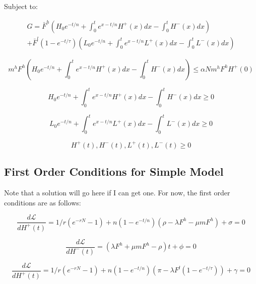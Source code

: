 \documentclass{easychithesis}
\newcommand{\Lagr}{\mathcal{L}}
\begin{document}
Subject to: 

\begin{multline}\label{eq:analyticalGen}
G = \bar{F}^h\left (H_0 e^{-t/n} + \int_0^t e^{x-t/n} H^+(x) dx - \int_0^t H^-(x)dx \right) \\ + \bar{F}^l(1-e^{-t/\tau}) \left ( L_0 e^{-t/n} + \int_0^t e^{x-t/n} L^+(x) dx - \int_0^t L^-(x)dx\right )
\end{multline}

\begin{equation}\label{eq:analyticalEmit}
m^hF^h\left (H_0 e^{-t/n} + \int_0^t e^{x-t/n} H^+(x) dx - \int_0^t H^-(x)dx \right) \leq \alpha N m^h F^h H^+(0)
\end{equation}

\begin{equation}\label{eq:analyticalHCapConstraint}
H_0 e^{-t/n} + \int_0^t e^{x-t/n} H^+(x) dx - \int_0^t H^-(x)dx \geq 0 
\end{equation}

\begin{equation}\label{eq:analyticalLCapConstraint}
L_0 e^{-t/n} + \int_0^t e^{x-t/n} L^+(x) dx - \int_0^t L^-(x)dx \geq 0 
\end{equation}

\begin{equation}\label{eq:analyticalDecisionVarConstraint}
H^+(t), H^-(t), L^+(t), L^-(t) \geq 0
\end{equation}


\subsection{First Order Conditions for Simple Model}

Note that a solution will go here if I can get one. For now, the first order conditions are as follows:

\begin{equation}\label{eq:dLdH+}
\frac{d\Lagr}{dH^+(t)} = 1/r(e^{-rN} -1) + n(1-e^{-t/n})(\rho - \lambda F^h -\mu m F^h) + \sigma = 0
\end{equation}

\begin{equation}\label{eq:dLdH-}
\frac{d\Lagr}{dH^-(t)} = (\lambda F^h +\mu m F^h - \rho)t + \phi = 0
\end{equation}

\begin{equation}\label{eq:dLdL+}
\frac{d\Lagr}{dH^+(t)} = 1/r(e^{-rN} -1) + n(1-e^{-t/n})(\pi - \lambda F^l(1-e^{-t/\tau})) + \gamma = 0
\end{equation}
\end{document}
